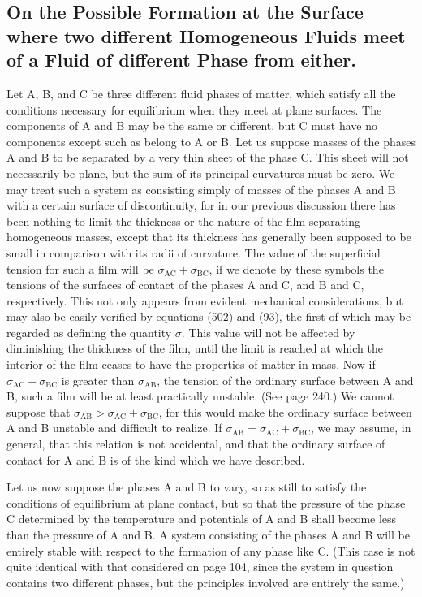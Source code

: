 \documentclass[12pt]{article}
\begin{document}
{\subsection{On the Possible Formation at the Surface where two different Homogeneous Fluids meet of a Fluid of different Phase from either.}
Let A, B, and C be three different fluid phases of matter, which satisfy all the conditions necessary for equilibrium when they meet at plane surfaces. The components of A and B may be the same or different, but C must have no components except such as belong to A or B. Let us suppose masses of the phases A and B to be separated by a very thin sheet of the phase C. This sheet will not necessarily be plane, but the sum of its principal curvatures must be zero. We may treat such a system as consisting simply of masses of the phases A and B with a certain surface of discontinuity, for in our previous discussion there has been nothing to limit the thickness or the nature of the film separating homogeneous masses, except that its thickness has generally been supposed to be small in comparison with its radii of curvature.  The value of the superficial tension for such a film will be $\sigma_{\text{AC}} + \sigma_{\text{BC}}$, if we denote by these symbols the tensions of the surfaces of contact of the phases A and C, and B and C, respectively. This not only appears from evident mechanical considerations, but may also be easily verified by equations (502) and (93), the first of which may be regarded as defining the quantity $\sigma$. This value will not be affected by diminishing the thickness of the film, until the limit is reached at which the interior of the film ceases to have the properties of matter in mass. Now if $\sigma_{\text{AC}} + \sigma_{\text{BC}}$ is greater than $\sigma_{\text{AB}}$, the tension of the ordinary surface between A and B, such a film will be at least practically unstable.  (See page 240.)  We cannot suppose that $\sigma_{\text{AB}} > \sigma_{\text{AC}}+ \sigma_{\text{BC}}$, for this would make the ordinary surface between A and B unstable and difficult to realize. If $\sigma_{\text{AB}} = \sigma_{\text{AC}}+ \sigma_{\text{BC}}$, we may assume, in general, that this relation is not accidental, and that the ordinary surface of contact for A and B is of the kind which we have described.

Let us now suppose the phases A and B to vary, so as still to satisfy the conditions of equilibrium at plane contact, but so that the pressure of the phase C determined by the temperature and potentials of A and B shall become less than the pressure of A and B. A system consisting of the phases A and B will be entirely stable with respect to the formation of any phase like C. (This case is not quite identical with that considered on page 104, since the system in question contains two different phases, but the principles involved are entirely the same.)

}
\end{document}
